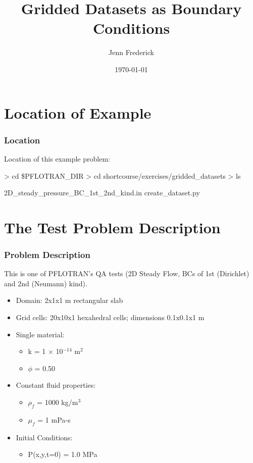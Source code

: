 \documentclass{beamer}
\begin{document}
\title{Gridded Datasets as Boundary Conditions}
\author{Jenn Frederick}
\date{\today}


\section{Location of Example}

\begin{frame}\frametitle{Location}

Location of this example problem:

\begin{semiverbatim}
> cd \$PFLOTRAN_DIR
> cd shortcourse/exercises/gridded_datasets
> ls

2D_steady_pressure_BC_1st_2nd_kind.in
create_dataset.py
\end{semiverbatim}

\end{frame}

\section{The Test Problem Description}

\begin{frame}\frametitle{Problem Description}

This is one of PFLOTRAN's QA tests (2D Steady Flow, BCs of 1st (Dirichlet) and 2nd (Neumann) kind).
  \begin{itemize}
    \item Domain: 2x1x1 m rectangular slab
    \item Grid cells: 20x10x1 hexahedral cells; dimensions 0.1x0.1x1 m
    \item Single material:
    \begin{itemize}
      \item k = 1 $\times$ 10$^{-14}$ m$^{2}$
      \item $\phi$ = 0.50
    \end{itemize}
    \item Constant fluid properties:
    \begin{itemize}
      \item $\rho_{f}$ = 1000 kg/m$^{3}$
      \item $\mu_{f}$ = 1 mPa-s
    \end{itemize}
    \item Initial Conditions:
    \begin{itemize}
      \item P(x,y,t=0) = 1.0 MPa
    \end{itemize}
    
  \end{itemize}

\end{frame}
\end{document}

